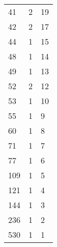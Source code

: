 \begin{table}
\begin{tabular}{lll}
    41     & 2 & 19 \\ 
    42     & 2 & 17 \\ 
    44     & 1 & 15 \\ 
    48     & 1 & 14 \\ 
    49     & 1 & 13 \\ 
    52     & 2 & 12 \\ 
    53     & 1 & 10 \\ 
    55     & 1 & 9 \\ 
    60     & 1 & 8 \\ 
    71     & 1 & 7 \\ 
    77     & 1 & 6 \\ 
    109     & 1 & 5 \\ 
    121     & 1 & 4 \\ 
    144     & 1 & 3 \\ 
    236     & 1 & 2 \\ 
    530     & 1 & 1 \\
    \end{tabular}
\end{table}
